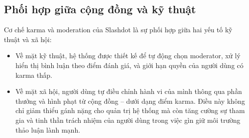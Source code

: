 \subsection{Phối hợp giữa cộng đồng và kỹ thuật}

Cơ chế karma và moderation của Slashdot là sự phối hợp giữa hai yếu tố kỹ thuật và xã hội:
\begin{itemize}
  \item Về mặt kỹ thuật, hệ thống được thiết kế để tự động chọn moderator, xử lý hiển thị bình luận theo điểm đánh giá, và giới hạn quyền của người dùng có karma thấp.
  \item Về mặt xã hội, người dùng tự điều chỉnh hành vi của mình thông qua phần thưởng và hình phạt từ cộng đồng -- dưới dạng điểm karma. Điều này không chỉ giảm thiểu gánh nặng cho quản trị hệ thống mà còn tăng cường sự tham gia và tinh thần trách nhiệm của người dùng trong việc gìn giữ môi trường thảo luận lành mạnh.
\end{itemize}
